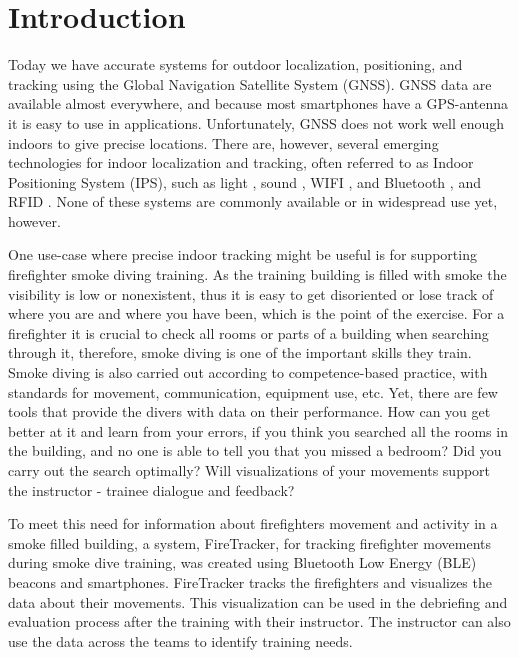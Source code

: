 \documentclass[../Main/thesis.tex]{subfiles}
\begin{document}
\chapter{Introduction}
\label{ch:introduction}

Today we have accurate systems for outdoor localization, positioning, and tracking using the Global Navigation Satellite System (GNSS). 
GNSS data are available almost everywhere, and because most smartphones have a GPS-antenna it is easy to use in applications.
Unfortunately, GNSS does not work well enough indoors to give precise locations.
There are, however, several emerging technologies for indoor localization and tracking, often referred to as Indoor Positioning System (IPS), such as light \citep{xiaohan2010improved}, sound \citep{schweinzer2010ultrasonic}, WIFI  \citep{chang2010robust}, and Bluetooth \citep{Takahashi2016}, and RFID \citep{rfid2017}.
None of these systems are commonly available or in widespread use yet, however.

One use-case where precise indoor tracking might be useful is for supporting firefighter smoke diving training. 
As the training building is filled with smoke the visibility is low or nonexistent, thus it is easy to get disoriented or lose track of where you are and where you have been, which is the point of the exercise.
For a firefighter it is crucial to check all rooms or parts of a building when searching through it, therefore, smoke diving is one of the important skills they train.
Smoke diving is also carried out according to competence-based practice, with standards for movement, communication, equipment use, etc.
Yet, there are few tools that provide the divers with data on their performance.
How can you get better at it and learn from your errors, if you think you searched all the rooms in the building, and no one is able to tell you that you missed a bedroom?
Did you carry out the search optimally?
Will visualizations of your movements support the instructor - trainee dialogue and feedback?

To meet this need for information about firefighters movement and activity in a smoke filled building, a system, FireTracker, for tracking firefighter movements during smoke dive training, was created using Bluetooth Low Energy (BLE) beacons and smartphones.
FireTracker tracks the firefighters and visualizes the data about their movements. 
This visualization can be used in the debriefing and evaluation process after the training with their instructor.
The instructor can also use the data across the teams to identify training needs.
\end{document}
